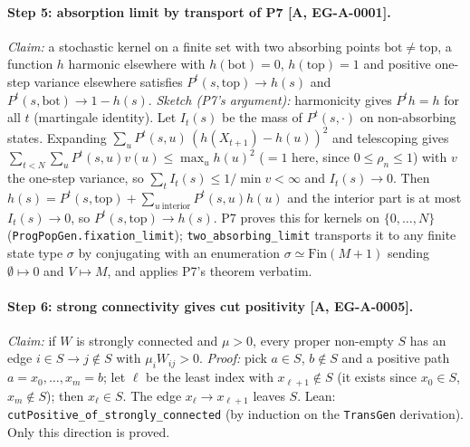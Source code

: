 \documentclass[11pt]{article}
\newcommand{\tier}[1]{\textsf{[#1]}}
\newcommand{\lean}[1]{\texttt{#1}}
\newcommand{\rhoF}{\rho_n}
\begin{document}


\paragraph{Step 5: absorption limit by transport of P7 \tier{A, EG-A-0001}.} \emph{Claim:} a stochastic kernel on a finite set with two absorbing points $\mathrm{bot}\neq\mathrm{top}$, a function $h$ harmonic elsewhere with $h(\mathrm{bot})=0$, $h(\mathrm{top})=1$ and positive one-step variance elsewhere satisfies $P^t(s,\mathrm{top})\to h(s)$ and $P^t(s,\mathrm{bot})\to1-h(s)$.
\emph{Sketch (P7's argument):} harmonicity gives $P^th=h$ for all $t$ (martingale identity). Let $I_t(s)$ be the mass of $P^t(s,\cdot)$ on non-absorbing states. Expanding $\sum_u P^t(s,u)\,(h(X_{t+1})-h(u))^2$ and telescoping gives $\sum_{t<N}\sum_uP^t(s,u)v(u)\le\max_uh(u)^2$ ($=1$ here, since $0\le\rhoF\le1$) with $v$ the one-step variance, so $\sum_tI_t(s)\le1/\min v<\infty$ and $I_t(s)\to0$. Then $h(s)=P^t(s,\mathrm{top})+\sum_{u\ \mathrm{interior}}P^t(s,u)h(u)$ and the interior part is at most $I_t(s)\to0$, so $P^t(s,\mathrm{top})\to h(s)$.
P7 proves this for kernels on $\{0,\dots,N\}$ (\lean{ProgPopGen.fixation\_limit}); \lean{two\_absorbing\_limit} transports it to any finite state type $\sigma$ by conjugating with an enumeration $\sigma\simeq\mathrm{Fin}(M{+}1)$ sending $\emptyset\mapsto0$ and $V\mapsto M$, and applies P7's theorem verbatim.



\paragraph{Step 6: strong connectivity gives cut positivity \tier{A, EG-A-0005}.} \emph{Claim:} if $W$ is strongly connected and $\mu>0$, every proper non-empty $S$ has an edge $i\in S\to j\notin S$ with $\mu_iW_{ij}>0$. \emph{Proof:} pick $a\in S$, $b\notin S$ and a positive path $a=x_0,\dots,x_m=b$; let $\ell$ be the least index with $x_{\ell+1}\notin S$ (it exists since $x_0\in S$, $x_m\notin S$); then $x_\ell\in S$. The edge $x_\ell\to x_{\ell+1}$ leaves $S$. Lean: \lean{cutPositive\_of\_strongly\_connected} (by induction on the \lean{TransGen} derivation). Only this direction is proved.


\end{document}
